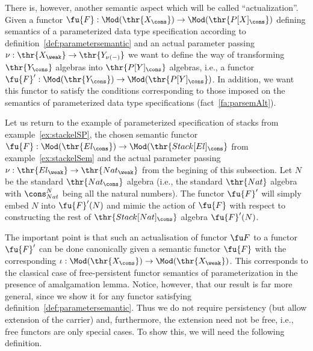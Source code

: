 There is, however, another semantic aspect which will be called ``actualization''.
Given a functor $\fu{F}:\Mod(\thr{X_\cons})\to \Mod(\thr{P[X]_\cons})$
defining semantics of a parameterized data type specification according to
definition~\ref{def:parametersemantic} and an actual parameter passing
$\nu:\thr{X_\weak}\to\thr{Y_{\nu(-)}}$ we want to define the way of
transforming $\thr{Y_\cons}$ algebras into $\thr{P[Y]_\cons}$ algebras, i.e.,
a functor $\fu{F}':\Mod(\thr{Y_\cons})\to \Mod(\thr{P[Y]_\cons})$. In
addition, we want this functor to satisfy the conditions corresponding to
those imposed on the semantics of parameterized data type specifications (fact~\ref{fa:parsemAlt}).

Let us return to the example of parameterized specification of stacks
from example~\ref{ex:stackelSP}, the chosen semantic functor
$\fu{F}:\Mod(\thr{El_\cons})\to\Mod(\thr{Stack[El]_\cons}$ from 
example~\ref{ex:stackelSem} and the actual parameter passing $\nu:\thr{El_\weak}\to\thr{Nat_\weak}$ from the
begining of this subsection. Let $N$ be the standard $\thr{Nat_\cons}$
algebra (i.e., the standard $\thr{Nat}$ algebra with $\cons_{Nat}^N$ being
all the natural numbers). The functor $\fu{F}'$ will simply embed $N$ into
$\fu{F}'(N)$ and mimic the action of $\fu{F}$ with respect to constructing
the rest of $\thr{Stack[Nat]_\cons}$ algebra $\fu{F}'(N)$. 

The important point is that such an actualisation of functor $\fu F$ 
to a functor $\fu{F}'$ can be done canonically given a semantic functor
$\fu{F}$ with the corresponding
$\iota:\Mod(\thr{X_\cons})\to\Mod(\thr{X_\weak})$.
This corresponds to the classical case of free-persistent functor semantics of
parameterization in the presence of amalgamation lemma. Notice, however, that
our result is far more general, since we show it for any functor satisfying
definition~\ref{def:parametersemantic}. Thus we 
do not require persistency (but
allow extension of the carrier) and, furthermore, the extension need not be
free, i.e., free functors are only special cases. 
To show this, we will need the following definition.

